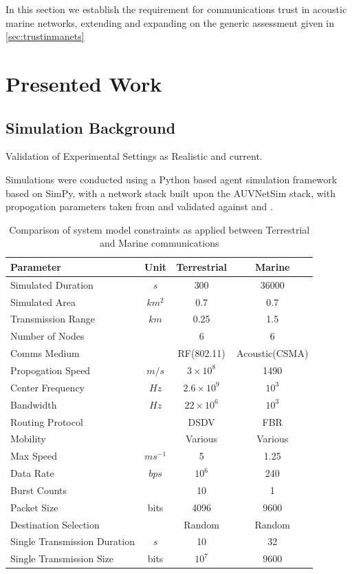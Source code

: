 \documentclass[runningheads,a4paper]{llncs}
\begin{document}
In this section we establish the requirement for communications trust in acoustic marine networks, extending and expanding on the generic assessment given in \ref{sec:trustinmanets}

\section{Presented Work}

\subsection{Simulation Background}

Validation of Experimental Settings as Realistic and current.

Simulations were conducted using a Python based agent simulation framework based on SimPy\cite{Mueller2003SimPy}, with a network stack built upon the AUVNetSim stack\cite{Miquel2008}, with propogation parameters taken from and validated against \cite{Stojanovic2007} and \cite{Stefanov2011}.

\begin{table}[h]
  \caption{Comparison of system model constraints as applied between Terrestrial and Marine communications} \label{tab:sysconstraints}
  \begin{center}
    \begin{tabular}{|l|c|c|c|}
      \hline
      Parameter & Unit & Terrestrial & Marine \\
      \hline
      Simulated Duration & $s$ & 300 & 36000\\
      Simulated Area & $km^2$ & 0.7 & 0.7 \\
      Transmission Range & $km$ & 0.25 & 1.5 \\
      Number of Nodes & & 6 & 6 \\
      Comms Medium & & RF(802.11) & Acoustic(CSMA)\\
      Propogation Speed& $m/s$ & $3\times10^8$ & 1490\\
      Center Frequency& $Hz$ & $2.6\times10^9$ & $10^3$ \\
      Bandwidth& $Hz$ & $22\times10^6$ & $10^3$\\
      Routing Protocol & & DSDV & FBR \\
      Mobility & & Various & Various \\
      Max Speed & $ms^{-1}$ & 5 & 1.25 \\
      Data Rate & $bps$ & $10^6$ & 240 \\
      Burst Counts & & 10 & 1 \\
      Packet Size & bits & 4096 & 9600 \\
      Destination Selection & & Random & Random\\
      Single Transmission Duration & $s$ & 10 & 32 \\
      Single Transmission Size & bits & $10^7$ & $9600$ \\
      \hline
    \end{tabular}
  \end{center}
\end{table}
\end{document}
